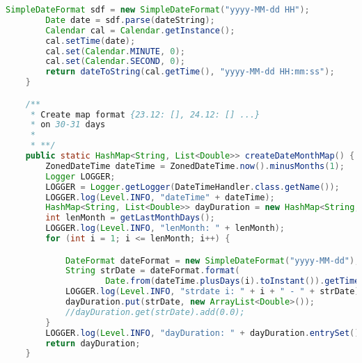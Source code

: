 \begin{lstlisting}[language=Java]
        SimpleDateFormat sdf = new SimpleDateFormat("yyyy-MM-dd HH");
        Date date = sdf.parse(dateString);
        Calendar cal = Calendar.getInstance();
        cal.setTime(date);
        cal.set(Calendar.MINUTE, 0);
        cal.set(Calendar.SECOND, 0);
        return dateToString(cal.getTime(), "yyyy-MM-dd HH:mm:ss");
    }

    /**
     * Create map format {23.12: [], 24.12: [] ...}
     * on 30-31 days
     *
     * **/
    public static HashMap<String, List<Double>> createDateMonthMap() {
        ZonedDateTime dateTime = ZonedDateTime.now().minusMonths(1);
        Logger LOGGER;
        LOGGER = Logger.getLogger(DateTimeHandler.class.getName());
        LOGGER.log(Level.INFO, "dateTime" + dateTime);
        HashMap<String, List<Double>> dayDuration = new HashMap<String, List<Double>>();
        int lenMonth = getLastMonthDays();
        LOGGER.log(Level.INFO, "lenMonth: " + lenMonth);
        for (int i = 1; i <= lenMonth; i++) {

            DateFormat dateFormat = new SimpleDateFormat("yyyy-MM-dd");
            String strDate = dateFormat.format(
                    Date.from(dateTime.plusDays(i).toInstant()).getTime());
            LOGGER.log(Level.INFO, "strdate i: " + i + " - " + strDate);
            dayDuration.put(strDate, new ArrayList<Double>());
            //dayDuration.get(strDate).add(0.0);
        }
        LOGGER.log(Level.INFO, "dayDuration: " + dayDuration.entrySet());
        return dayDuration;
    }



\end{lstlisting}

